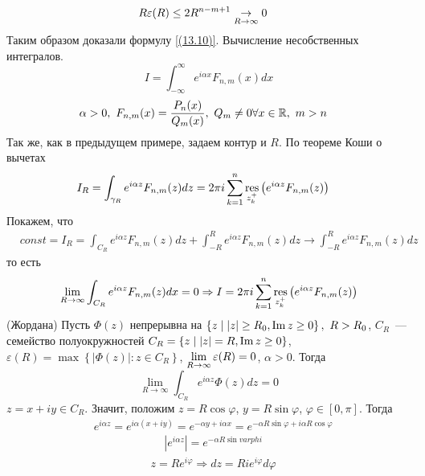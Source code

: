 \begin{align*}
  & R\varepsilon(R) \leq 2R^{n-m+1} \underset{R \to \infty}{\to} 0
\end{align*}
Таким образом доказали формулу \eqref{(13.10)}.
\Example
Вычисление несобственных интегралов.
\begin{equation}\label{(13.11)}
    I = \int_{-\infty}^{\infty}e^{i\alpha x}F_{n,m}(x)dx
\end{equation}
\begin{align*}
  & \alpha > 0, \ F_{n,m}(x) = \frac{P_n(x)}{Q_m(x)}, \ Q_m \neq 0 \forall x \in \mathbb{R}, \ m > n
\end{align*}
Так же, как в предыдущем примере, задаем контур и $R$. По теореме Коши о вычетах
\begin{align*}
  & I_R = \int_{\gamma_R}e^{i\alpha z}F_{n,m}(z) dz = 2 \pi i \sum_{k=1}^n\underset{z_k^+}{\mathrm{res}}\left( e^{i\alpha z} F_{n,m}(z)\right)
\end{align*}
Покажем, что
\begin{align*}
  & const = I_R = \int_{C_R}e^{i\alpha z}F_{n,m}(z) dz + \int_{-R}^Re^{i\alpha z}F_{n,m}(z) dz \to \int_{-R}^Re^{i\alpha z}F_{n,m}(z) dz
\end{align*}
то есть
\begin{equation}\label{(13.12)}
    \lim_{R \to \infty} \int_{C_R}e^{i\alpha z}F_{n,m}(z)dx = 0 \Rightarrow I = 2 \pi i \sum_{k=1}^n \underset{z_k^+}{\mathrm{res}}\left( e^{i \alpha z}F_{n,m}(z) \right)
\end{equation}
\lemma (Жордана)
Пусть $\Phi(z)$ непрерывна на $\left\{ z \mid \left| z \right| \geq R_0, \mathrm{Im}\, z
    \geq 0 \right\}, \ R > R_0$, $C_R$~--- семейство полуокружностей $C_R = \{z
\mid \left| z \right| = R, \mathrm{Im}\, z \geq 0\}$, $ \varepsilon(R) = \max \left\{
    \left| \Phi(z) \right| : z \in C_R \right\}$, $ \displaystyle \lim_{R \to \infty}
\varepsilon(R) = 0$, $\alpha > 0$. Тогда
\begin{equation}\label{(13.13)}
    \lim_{R \to \infty}\int_{C_R}e^{i \alpha z}\Phi(z)dz = 0
\end{equation}
\pr
$z = x + iy \in C_R$. Значит, положим $z = R \cos \varphi$, $y = R \sin \varphi$,
$ \varphi \in [0,\pi]$. Тогда
\begin{align*}
  & e^{i \alpha z} = e^{i \alpha(x+iy)} = e^{-\alpha y + i \alpha x} = e^{-\alpha R \sin \varphi + i \alpha R \cos \varphi}
\end{align*}
\begin{align*}
  & \left| e^{i \alpha z} \right| = e^{-\alpha R \sin varphi}
\end{align*}
\begin{align*}
  & z = R e^{i \varphi} \Rightarrow dz = R i e^{i \varphi} d \varphi
\end{align*}
